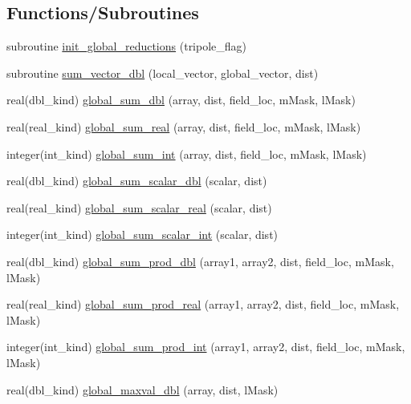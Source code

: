 \subsection*{Functions/Subroutines}
\begin{DoxyCompactItemize}
\item 
subroutine \hyperlink{namespaceice__global__reductions_ab9fb73d7096dbb733f5878483a696cf1}{init\_\-global\_\-reductions} (tripole\_\-flag)
\item 
subroutine \hyperlink{namespaceice__global__reductions_adeb296e7d016ecf60a1c72d19d04a868}{sum\_\-vector\_\-dbl} (local\_\-vector, global\_\-vector, dist)
\item 
real(dbl\_\-kind) \hyperlink{namespaceice__global__reductions_a6b1dda84ce2a327ce579b34697eeb79f}{global\_\-sum\_\-dbl} (array, dist, field\_\-loc, mMask, lMask)
\item 
real(real\_\-kind) \hyperlink{namespaceice__global__reductions_a8e8362fe94cfeec02a6fd9ee6ffc6b3f}{global\_\-sum\_\-real} (array, dist, field\_\-loc, mMask, lMask)
\item 
integer(int\_\-kind) \hyperlink{namespaceice__global__reductions_a75c457045df8607362a57112dd907a6d}{global\_\-sum\_\-int} (array, dist, field\_\-loc, mMask, lMask)
\item 
real(dbl\_\-kind) \hyperlink{namespaceice__global__reductions_a019a480688c267b2dfce991d9c8e0d51}{global\_\-sum\_\-scalar\_\-dbl} (scalar, dist)
\item 
real(real\_\-kind) \hyperlink{namespaceice__global__reductions_a909b7495f4cdff7e8d357fa0acdeca74}{global\_\-sum\_\-scalar\_\-real} (scalar, dist)
\item 
integer(int\_\-kind) \hyperlink{namespaceice__global__reductions_a1d53804ee999b9e2c22cfb731f48c5ff}{global\_\-sum\_\-scalar\_\-int} (scalar, dist)
\item 
real(dbl\_\-kind) \hyperlink{namespaceice__global__reductions_aafaab9f2e8ca36d2f081b9e3a0caef2c}{global\_\-sum\_\-prod\_\-dbl} (array1, array2, dist, field\_\-loc, mMask, lMask)
\item 
real(real\_\-kind) \hyperlink{namespaceice__global__reductions_a8ded0a6550ccfe08da739b778ccdadf3}{global\_\-sum\_\-prod\_\-real} (array1, array2, dist, field\_\-loc, mMask, lMask)
\item 
integer(int\_\-kind) \hyperlink{namespaceice__global__reductions_a4aff2c1b8fa4c266a0f08cef29bba2ab}{global\_\-sum\_\-prod\_\-int} (array1, array2, dist, field\_\-loc, mMask, lMask)
\item 
real(dbl\_\-kind) \hyperlink{namespaceice__global__reductions_afcc42be44d8b5383d354d22c849ca69f}{global\_\-maxval\_\-dbl} (array, dist, lMask)

\end{DoxyCompactItemize}
